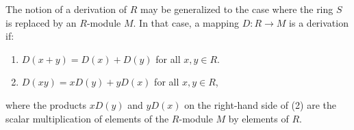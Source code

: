 The notion of a derivation of $R$ may be generalized to the case where the ring $S$ is replaced by an $R$-module $M$. In that case, a mapping $D: R \to M$ is a derivation if:
\begin{enumerate}
\item $D(x + y) = D(x) + D(y)$ for all $x, y \in R$.
\item $D(xy) = x D(y) + y D(x)$ for all $x, y \in R$,
\end{enumerate}
where the products $x D(y)$ and $y D(x)$ on the right-hand side of (2) are the scalar multiplication of elements of the $R$-module $M$ by elements of $R$.
